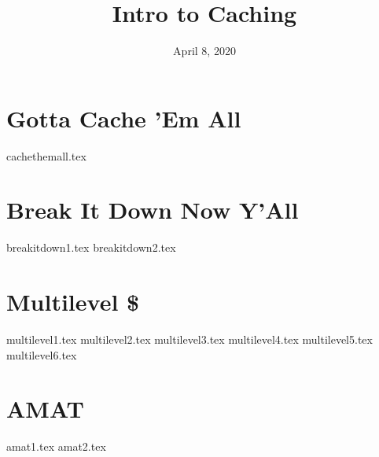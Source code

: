 \documentclass[11pt]{exam}
\title{Intro to Caching}
\date{April 8, 2020}
\begin{document}
\maketitle

\section{Gotta Cache 'Em All}
\begin{questions}
{cachethemall.tex}
\end{questions}
\newpage

\section{Break It Down Now Y'All}
\begin{questions}
{breakitdown1.tex}
{breakitdown2.tex}
\end{questions}
\newpage

\section{Multilevel \$}
\begin{questions}
{multilevel1.tex}
{multilevel2.tex}
{multilevel3.tex}
{multilevel4.tex}
{multilevel5.tex}
{multilevel6.tex}
\end{questions}
\newpage

\section{AMAT}
\begin{questions}
{amat1.tex}
{amat2.tex}
\end{questions}
\newpage
\end{document}
